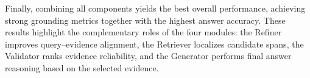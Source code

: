 Finally, combining all components yields the best overall performance, achieving strong grounding metrics together with the highest answer accuracy. These results highlight the complementary roles of the four modules: the Refiner improves query--evidence alignment, the Retriever localizes candidate spans, the Validator ranks evidence reliability, and the Generator performs final answer reasoning based on the selected evidence.

